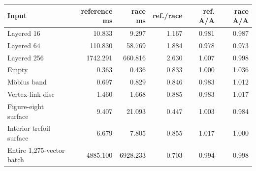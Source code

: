 \begin{center}
\small
\begin{tabular}{lrrrrr}
\toprule
Input & reference ms & race ms & ref./race & ref. A/A & race A/A\\
\midrule
Layered 16 & 10.833 & 9.297 & 1.167 & 0.981 & 0.987\\
Layered 64 & 110.830 & 58.769 & 1.884 & 0.978 & 0.973\\
Layered 256 & 1742.291 & 660.816 & 2.630 & 1.007 & 0.998\\
Empty & 0.363 & 0.436 & 0.833 & 1.000 & 1.036\\
M\"obius band & 0.697 & 0.829 & 0.846 & 0.983 & 1.012\\
Vertex-link disc & 1.460 & 1.668 & 0.885 & 0.983 & 1.017\\
Figure-eight surface & 9.407 & 21.093 & 0.447 & 1.003 & 0.984\\
Interior trefoil surface & 6.679 & 7.805 & 0.855 & 1.017 & 1.000\\
Entire 1,275-vector batch & 4885.100 & 6928.233 & 0.703 & 0.994 & 0.998\\
\bottomrule
\end{tabular}
\end{center}
